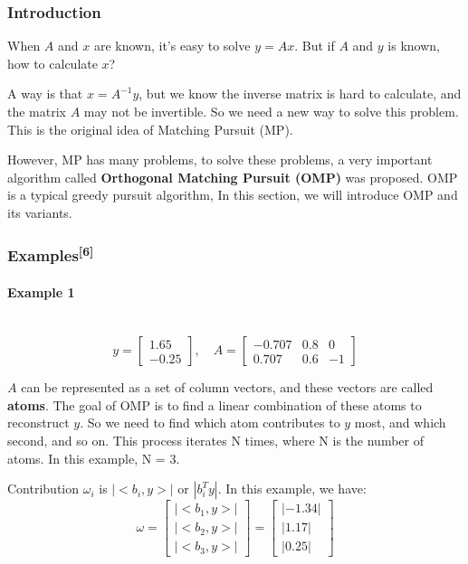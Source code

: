 \documentclass[12pt]{ctexart}
\begin{document}
\subsubsection{\textbf{Introduction}}

When $A$ and $x$ are known, it's easy to solve $y = Ax$. But if $A$ and $y$ is known,
how to calculate $x$?

A way is that $x = A^{-1}y$, but we know the inverse matrix is hard to calculate,
and the matrix $A$ may not be invertible. So we need a new way to solve this problem.
This is the original idea of Matching Pursuit (MP).

However, MP has many problems, to solve these problems, a very important algorithm
called \textbf{Orthogonal Matching Pursuit (OMP)} was proposed. OMP is a typical greedy
pursuit algorithm, In this section, we will introduce OMP and its variants.

\subsubsection[\textbf{Examples}]{\textbf{Examples}\textsuperscript{[6]}}

\paragraph{\textbf{Example 1}}\mbox{}\\
\[
  y = \begin{bmatrix} 1.65 \\ -0.25 \end{bmatrix}, \quad
  A = \begin{bmatrix} -0.707 & 0.8 & 0 \\ 0.707 & 0.6 & -1 \end{bmatrix}
\]

$A$ can be represented as a set of column vectors, and these vectors are called
\textbf{atoms}. The goal of OMP is to find a linear combination of these atoms to
reconstruct $y$. So we need to find which atom contributes to $y$ most, and which
second, and so on. This process iterates N times, where N is the number of atoms.
In this example, N = 3.

Contribution $\omega_i$ is $|<b_i, y>|$ or $|b_i^Ty|$. In this example, we have:
\[
  \omega = \begin{bmatrix}
    |<b_1, y>| \\
    |<b_2, y>| \\
    |<b_3, y>|
  \end{bmatrix}
  = \begin{bmatrix}
    |-1.34| \\
    |1.17| \\
    |0.25|
  \end{bmatrix}
\]
\end{document}
